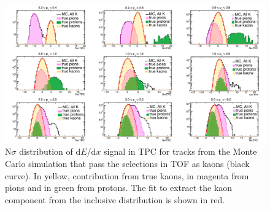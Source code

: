 \begin{figure}[!h]
 \centering
 \includegraphics[angle=0, width=15cm]{./FigCap5/KaonTPCFromTOF_MC.png}
 \caption{N$\sigma$ distribution of d$E$/d$x$ signal in TPC for tracks from the Monte Carlo simulation that pass the selections in TOF as kaons (black curve). In yellow, contribution from true kaons, in magenta from pions and in green from protons. The fit to extract the kaon component from the inclusive distribution is shown in red.}
 \label{fig:MCKaonsTPC} 
\end{figure}

